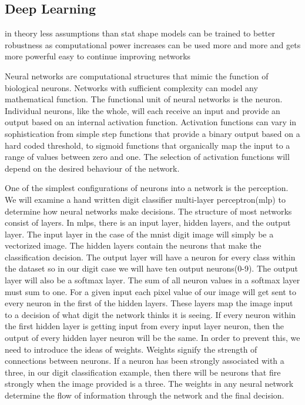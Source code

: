 \documentclass[12pt]{article}
\begin{document}
\subsection{Deep Learning}
in theory less assumptions than stat shape models
can be trained to better robustness
as computational power increases can be used more and more and gets more powerful
easy to continue improving networks
\par %
Neural networks are computational structures that mimic the function of biological neurons. Networks with sufficient complexity can model any mathematical function. 
The functional unit of neural networks is the neuron.
Individual neurons, like the whole, will each receive an input and provide an output based on an internal activation function.
Activation functions can vary in sophistication from simple step functions that provide a binary output based on a hard coded threshold,
to sigmoid functions that organically map the input to a range of values between zero and one.
The selection of activation functions will depend on the desired behaviour of the network. 
\par
One of the simplest configurations of neurons into a network is the perception.
We will examine a hand written digit classifier multi-layer perceptron(mlp) to determine how neural networks make decisions.
The structure of most networks consist of layers. In mlps, there is an input layer, hidden layers, and the output layer. 
The input layer in the case of the mnist digit image will simply be a vectorized image. The hidden layers contain the neurons that make the classification decision.
The output layer will have a neuron for every class within the dataset so in our digit case we will have ten output neurons(0-9). The output layer will also be a softmax layer. 
The sum of all neuron values in a softmax layer must sum to one.
For a given input each pixel value of our image will get sent to every neuron in the first of the hidden layers.
These layers map the image input to a decision of what digit the network thinks it is seeing.
If every neuron within the first hidden layer is getting input from every input layer neuron, then the output of every hidden layer neuron will be the same. 
In order to prevent this, we need to introduce the ideas of weights. Weights signify the strength of connections between neurons.
If a neuron has been strongly associated with a three, in our digit classification example, then there will be neurons that fire strongly when the image provided is a three.
The weights in any neural network determine the flow of information through the network and the final decision.
\end{document}
